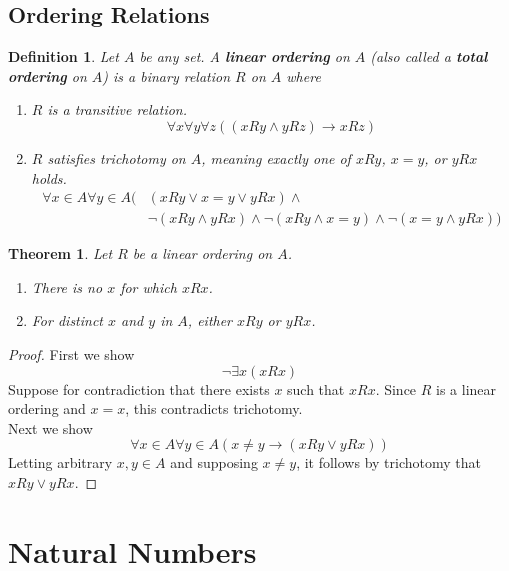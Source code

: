 \documentclass{report}
\newtheorem{theorem}[theo]{Theorem}
\newtheorem{definition}[theo]{Definition}
\begin{document}
\section{Ordering Relations}
\begin{definition}
Let $A$ be any set. A \textbf{linear ordering} on $A$ (also called a \textbf{total ordering} on $A$) is a binary
relation $R$ on $A$ where
\begin{enumerate}
\item $R$ is a transitive relation.
\begin{equation*}
\forall x\forall y\forall z((xRy\land yRz)\to xRz)
\end{equation*}
\item $R$ satisfies trichotomy on $A$, meaning exactly one of $xRy$, $x=y$, or $yRx$ holds.
\begin{align*}
\forall x\in A\forall y\in A(&(xRy\lor x=y\lor yRx)\land\\
&\neg(xRy\land yRx)\land\neg(xRy\land x=y)\land\neg(x=y\land yRx))
\end{align*}
\end{enumerate}
\end{definition}
\begin{theorem}
Let $R$ be a linear ordering on $A$. 
\begin{enumerate}
\item There is no $x$ for which $xRx$.
\item For distinct $x$ and $y$ in $A$, either $xRy$ or $yRx$.
\end{enumerate}
\end{theorem}
\begin{proof}
First we show
\begin{equation*}
\neg\exists x(xRx)
\end{equation*}
Suppose for contradiction that there exists $x$ such that $xRx$. Since $R$ is a linear ordering and $x=x$, this contradicts 
trichotomy.\\
\indent Next we show
\begin{equation*}
\forall x\in A\forall y\in A(x\neq y\to(xRy\lor yRx))
\end{equation*}
Letting arbitrary $x,y\in A$ and supposing $x\neq y$, it follows by trichotomy that $xRy\lor yRx$.
\end{proof}
\newpage

\chapter{Natural Numbers}
\end{document}
